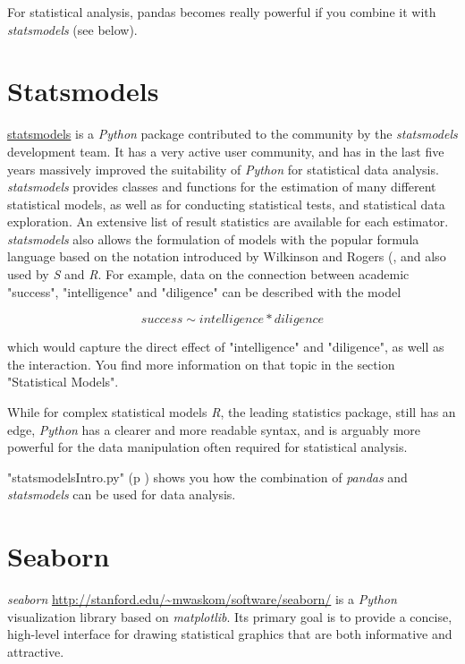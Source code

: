 For statistical analysis, pandas becomes really powerful if you combine it with \emph{statsmodels} (see below).

\section{Statsmodels}

\href{http://statsmodels.sourceforge.net/.}{statsmodels} is a \emph{Python} package contributed to the community by the \emph{statsmodels} development team. It has a very active user community, and has in the last five years massively improved the suitability of \emph{Python} for statistical data analysis. \emph{statsmodels} provides classes and functions for the estimation of many different statistical models, as well as for conducting statistical tests, and statistical data exploration. An extensive list of result statistics are available for each estimator. \emph{statsmodels} also allows the formulation of models with the popular formula language based on the notation introduced by Wilkinson and Rogers (\cite{Wilkinson1973}, and also used by \emph{S} and \emph{R}. For example, data on the connection between academic "success", "intelligence" and "diligence" can be described with the model

\begin{equation*}
    success \sim intelligence * diligence
\end{equation*}

which would capture the direct effect of "intelligence" and "diligence", as well as the interaction. You find more information on that topic in the section "Statistical Models".

While for complex statistical models \emph{R}, the leading statistics package, still has an edge, \emph{Python} has a clearer and more readable syntax, and is arguably more powerful for the data manipulation often required for statistical analysis.

\PyImg "statsmodelsIntro.py" (p \pageref{py:statsmodelsIntro}) shows you how the combination of \emph{pandas} and \emph{statsmodels} can be used for data analysis.

\section{Seaborn}

\emph{seaborn} \url{http://stanford.edu/~mwaskom/software/seaborn/} is a \emph{Python} visualization library based on \emph{matplotlib}. Its primary goal is to provide a concise, high-level interface for drawing statistical graphics that are both informative and attractive.

